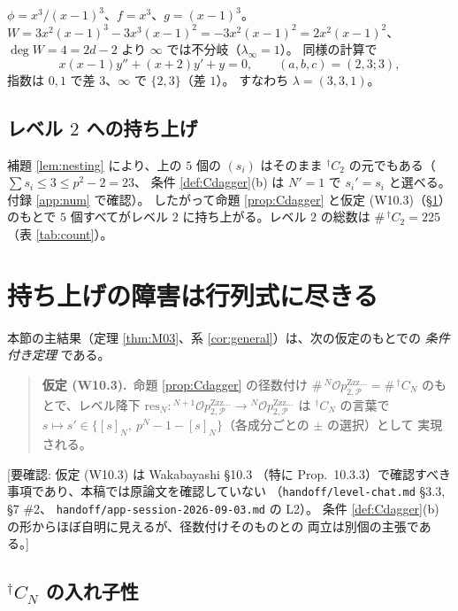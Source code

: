 \documentclass[a4paper,11pt]{ltjsarticle}
\theoremstyle{plain}
\theoremstyle{definition}
\newcommand{\NeedsCheck}[1]{\textcolor{blue!70!black}{\textsf{[要確認: #1]}}}
\newcommand{\sP}{\mathscr{P}}
\newcommand{\Op}{\mathcal{O}p}
\newcommand{\Zzz}{\mathrm{Zzz\dots}}
\begin{document}
$\phi=x^3/(x-1)^3$、$f=x^3$、$g=(x-1)^3$。
$W=3x^2(x-1)^3-3x^3(x-1)^2=-3x^2(x-1)^2=2x^2(x-1)^2$、
$\deg W=4=2d-2$ より $\infty$ では不分岐（$\lambda_\infty=1$）。
同様の計算で
\[
  x(x-1)y''+(x+2)y'+y=0,\qquad (a,b,c)=(2,3;3),
\]
指数は $0,1$ で差 $3$、$\infty$ で $\{2,3\}$（差 $1$）。
すなわち $\lambda=(3,3,1)$。

\subsection{レベル $2$ への持ち上げ}

補題 \ref{lem:nesting} により、上の $5$ 個の $(s_i)$ はそのまま
${}^{\dagger}C_2$ の元でもある（$\sum s_i\le3\le p^2-2=23$、
条件 \ref{def:Cdagger}(b) は $N'=1$ で $s_i'=s_i$ と選べる。付録 \ref{app:num} で確認）。
したがって命題 \ref{prop:Cdagger} と仮定 (W10.3)（\S\ref{sec:M03}）のもとで
$5$ 個すべてがレベル $2$ に持ち上がる。レベル $2$ の総数は $\#\,{}^{\dagger}C_2=225$
（表 \ref{tab:count}）。

\section{持ち上げの障害は行列式に尽きる}\label{sec:M03}

本節の主結果（定理 \ref{thm:M03}、系 \ref{cor:general}）は、次の仮定のもとでの
\emph{条件付き定理} である。

\begin{quote}
\textbf{仮定 (W10.3).}\ 命題 \ref{prop:Cdagger} の径数付け
$\#\,{}^N\Op^{\Zzz}_{2,\sP}=\#\,{}^{\dagger}C_N$ のもとで、レベル降下
$\mathrm{res}_N:{}^{N+1}\Op^{\Zzz}_{2,\sP}\to{}^{N}\Op^{\Zzz}_{2,\sP}$ は
${}^{\dagger}C_N$ の言葉で
$s\mapsto s'\in\{[s]_N,\ p^N-1-[s]_N\}$（各成分ごとの $\pm$ の選択）として
実現される。
\end{quote}

\NeedsCheck{仮定 (W10.3) は Wakabayashi \cite{Wak2} \S10.3
（特に Prop.~10.3.3）で確認すべき事項であり、本稿では原論文を確認していない
（\texttt{handoff/level-chat.md} \S3.3, \S7 \#2、
\texttt{handoff/app-session-2026-09-03.md} の L2）。
条件 \ref{def:Cdagger}(b) の形からほぼ自明に見えるが、径数付けそのものとの
両立は別個の主張である。}

\subsection{${}^{\dagger}C_N$ の入れ子性}
\end{document}
